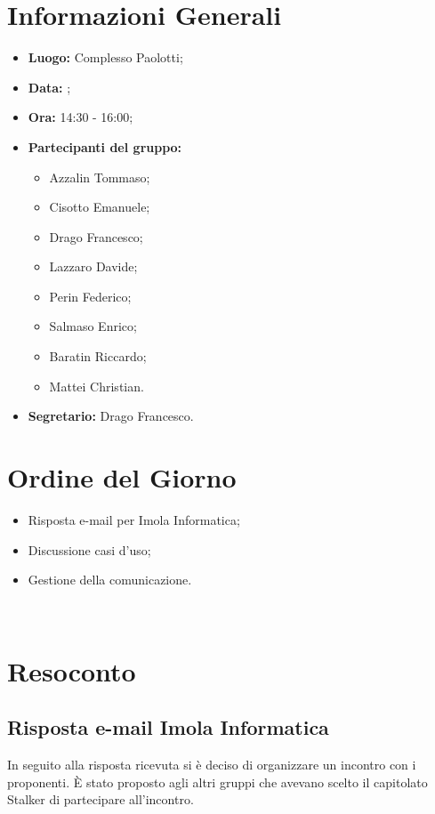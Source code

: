 \section{Informazioni Generali}
\begin{itemize}
\item \textbf{Luogo:} Complesso Paolotti;
\item \textbf{Data:} \Data;
\item \textbf{Ora:} 14:30 - 16:00;
\item \textbf{Partecipanti del gruppo:}
	\begin{itemize}
	\item Azzalin Tommaso; 
	\item Cisotto Emanuele; 
	\item Drago Francesco;
	\item Lazzaro Davide;
	\item Perin Federico;
	\item Salmaso Enrico;
	\item Baratin Riccardo;
	\item Mattei Christian.
	\end{itemize} 
\item \textbf{Segretario:} Drago Francesco.
\end{itemize}

\clearpage

\section{Ordine del Giorno}
\begin{itemize}
\item Risposta e-mail per Imola Informatica;
\item Discussione casi d'uso;
\item Gestione della comunicazione.
\end{itemize}

~\\

\section{Resoconto}
\subsection{Risposta e-mail Imola Informatica}
In seguito alla risposta ricevuta si è deciso di organizzare un incontro con i proponenti.
È stato proposto agli altri gruppi che avevano scelto il capitolato Stalker di partecipare all'incontro. 

